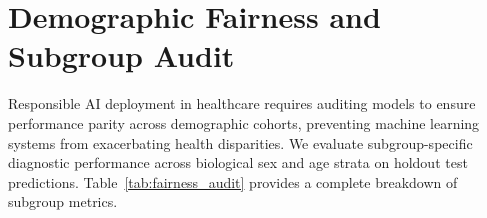\documentclass[12pt,a4paper]{report}
\begin{document}
	\section{Demographic Fairness and Subgroup Audit}
	Responsible AI deployment in healthcare requires auditing models to ensure performance parity across demographic cohorts, preventing machine learning systems from exacerbating health disparities. We evaluate subgroup-specific diagnostic performance across biological sex and age strata on holdout test predictions. Table~\ref{tab:fairness_audit} provides a complete breakdown of subgroup metrics.
	
	\begin{table}[h!]
		\centering
		\caption{Demographic performance and fairness audit across patient age strata and biological sex on the holdout test set ($N=8,022$). Brackets represent $95\%$ CIs.}
		\label{tab:fairness_audit}
		\vspace{0.5em}
	\end{table}
	
\end{document}
